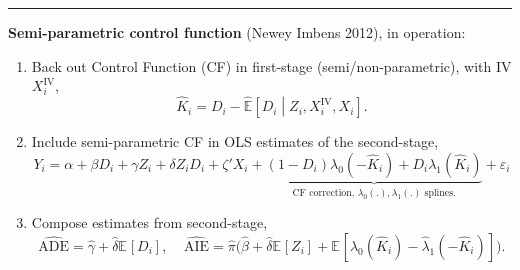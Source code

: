 \documentclass[dvipsnames]{beamer} %
\renewcommand{\vec}[1]{\boldsymbol{\mathit{#1}}}                           %
\newcommand{\E}[2][]{\mathbb{E}_{#1} \left[ #2 \right]}                    %
\renewcommand{\hat}[1]{\widehat{#1}}                                       %
\begin{document}
\begin{frame}[noframenumbering]
    \par\noindent\rule{\textwidth}{0.4pt}
    \textbf{Semi-parametric control function} (Newey Imbens 2012), in operation:
    \begin{enumerate}
        \item Back out Control Function (CF) in first-stage (semi/non-parametric), with IV $\vec X_i^\text{IV}$,
        \vspace{-0.25cm}
        \[ \hat K_i = D_i -
            \hat{\mathbb E} \left[ D_i \middle\vert Z_i, \vec X_i^\text{IV}, \vec X_i \right].
        \]
        \item Include semi-parametric CF in OLS estimates of the second-stage,
        \[ Y_i = \alpha + \beta D_i + \gamma Z_i + \delta Z_i D_i
            + \vec \zeta' \vec X_i
            + \underbrace{\left(1 - D_i \right)\lambda_0\left(-\hat K_i\right)
                + D_i \lambda_1\left(\hat K_i\right)}_{
                \text{CF correction, $\lambda_0(.), \lambda_1(.)$ splines.}}
            + \varepsilon_i \]
        \vspace{-0.5cm}
        \item Compose estimates from second-stage,
        \[ \hat{\text{ADE}}
            = \hat\gamma + \hat\delta \E{D_i}, \;\;\;\;
        \hat{\text{AIE}}
            = \hat\pi \Big(
                \hat\beta +  \hat\delta \E{Z_i}
                + \E{\hat\lambda_0\left(\hat K_i\right) -
                    \hat\lambda_1\left(-\hat K_i\right)}\Big). \]
    \end{enumerate}
\end{frame}
\end{document}
